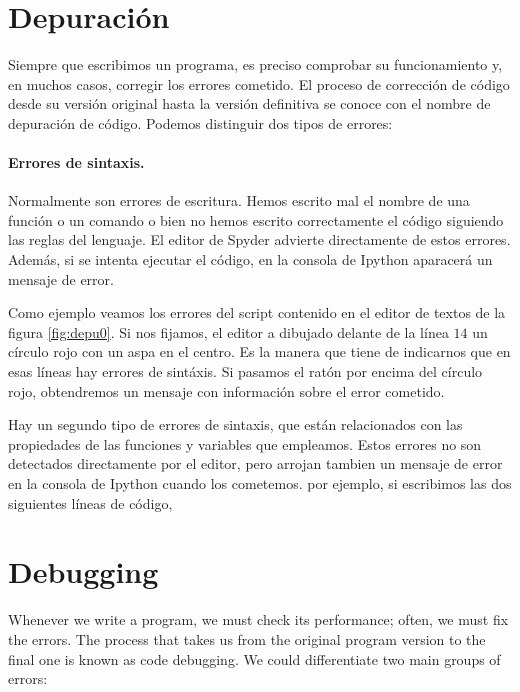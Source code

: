 \begin{paracol}{2}
\section{Depuración}
Siempre que escribimos un programa, es preciso comprobar su funcionamiento y, en  muchos casos, corregir los errores cometido. El proceso de corrección de código desde su versión original hasta la versión definitiva se conoce con el nombre de depuración de código. Podemos distinguir dos tipos de errores:

\paragraph{Errores de sintaxis.} Normalmente son errores de escritura. Hemos escrito mal el nombre de una función o un comando o bien no hemos escrito correctamente el código siguiendo las reglas del lenguaje. El editor de Spyder advierte directamente de estos errores. Además, si se intenta ejecutar el código, en la consola de Ipython aparacerá un mensaje de error. 

Como ejemplo veamos los errores del script contenido  en el editor de textos de la figura \ref{fig:depu0}. Si nos fijamos, el editor a dibujado delante de la línea $14$ un círculo rojo con un aspa en el centro. Es la manera que tiene de indicarnos que en esas líneas hay errores de sintáxis. Si pasamos el ratón por encima del círculo rojo, obtendremos un mensaje con información sobre el error cometido.

Hay un segundo tipo de errores de sintaxis, que están relacionados con las propiedades de las funciones y variables que empleamos. Estos errores no son detectados directamente por el editor, pero arrojan tambien un mensaje de error en la consola de Ipython cuando los cometemos. por ejemplo, si escribimos las dos siguientes líneas de código,
\switchcolumn
\section[Debugging]{Debugging}
Whenever we write a program, we must check its performance; often, we must fix the errors. The process that takes us from the original program version to the final one is known as code debugging. We could differentiate two main groups of errors:


\end{paracol}
